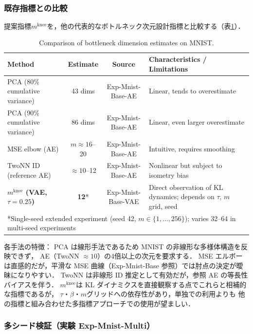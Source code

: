 \documentclass[11pt,a4paper]{jsarticle}
\newcommand{\mknee}{m^{\mathrm{knee}}}
\begin{document}
\subsubsection{既存指標との比較}\label{sec:exp_comparison}

提案指標$\mknee$を，他の代表的なボトルネック次元設計指標と比較する（表\ref{tab:method_comparison}）．

\begin{table}[H]
\centering
\caption{Comparison of bottleneck dimension estimates on MNIST.}
\label{tab:method_comparison}
\small
\begin{tabular}{lccl}
\toprule
Method & Estimate & Source & Characteristics / Limitations \\
\midrule
PCA (80\% cumulative variance) & 43 dims & Exp-Mnist-Base-AE & Linear, tends to overestimate \\
PCA (90\% cumulative variance) & 86 dims & Exp-Mnist-Base-AE & Linear, even larger overestimate \\
MSE elbow (AE) & $m \approx 16$--20 & Exp-Mnist-Base-AE & Intuitive, requires smoothing \\
TwoNN ID (reference AE) & $\approx 10$--12 & Exp-Mnist-Base-AE & Nonlinear but subject to isometry bias \\
\textbf{$\mknee$ (VAE, $\tau=0.25$)} & \textbf{12}* & Exp-Mnist-Base-VAE & Direct observation of KL dynamics; depends on $\tau$, $m$ grid, seed \\
\multicolumn{4}{l}{*Single-seed extended experiment (seed 42, $m \in \{1,\ldots,256\}$); varies 32--64 in multi-seed experiments} \\
\bottomrule
\end{tabular}
\end{table}

各手法の特徴：
PCA は線形手法であるため MNIST の非線形な多様体構造を反映できず，
AE（TwoNN $\approx 10$）の4倍以上の次元を要求する．
MSE エルボーは直感的だが，平滑な MSE 曲線（Exp-Mnist-Base 参照）では肘点の決定が曖昧になりやすい．
TwoNN は非線形 ID 推定として有効だが，参照 AE の等長性バイアスを伴う．
$\mknee$は KL ダイナミクスを直接観察する点でこれらと相補的な指標であるが，
$\tau$・$\beta$・$m$グリッドへの依存性があり，単独での利用よりも
他の指標と組み合わせた多指標アプローチでの使用が望ましい．

\subsubsection{多シード検証（実験 Exp-Mnist-Multi）}\label{sec:exp_multiseed}
\end{document}

